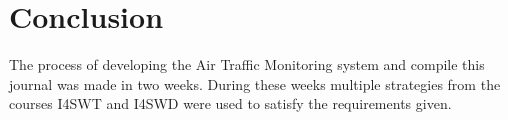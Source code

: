 \section{Conclusion}
The process of developing the Air Traffic Monitoring system and compile this journal was made in two weeks. During these weeks multiple strategies from the courses I4SWT and I4SWD were used to satisfy the requirements given.